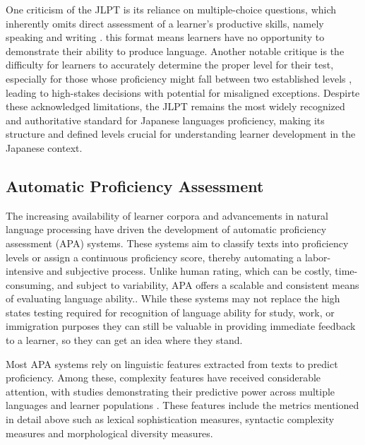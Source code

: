One criticism of the JLPT is its reliance on multiple-choice questions, which inherently omits direct assessment of
a learner's productive skills, namely speaking and writing \citet{JLPTcriticism}. this format means learners have
no opportunity to demonstrate their ability to produce language. Another notable critique is the difficulty for
learners to accurately determine the proper level for their test, especially for those whose proficiency might fall
between two established levels \citep{JLPTcriticism}, leading to high-stakes decisions with potential for misaligned
exceptions. Despirte these acknowledged limitations, the JLPT remains the most widely
recognized and authoritative standard for Japanese languages proficiency, making its structure and defined levels
crucial for understanding learner development in the Japanese context.

\subsection{Automatic Proficiency Assessment}


The increasing availability of learner corpora and advancements in natural language processing have driven the
development of automatic proficiency assessment (APA) systems. These systems aim to classify texts into proficiency
levels or assign a continuous proficiency score, thereby automating a labor-intensive and subjective process. Unlike
human rating, which can be costly, time-consuming, and subject to variability, APA offers a scalable and consistent
means of evaluating language ability.. While these systems may not replace the
high states testing required for recognition of language ability for study, work, or immigration purposes they can
still be valuable in providing immediate feedback to a learner, so they can get an idea where they stand.

Most APA systems rely on linguistic features extracted from texts to predict proficiency. Among these, complexity
features have received considerable attention, with studies demonstrating their predictive power across multiple
languages and learner populations \citep{Lu2010,Ortega2003,Brezina2019,Jiang2019}. These features include the metrics
mentioned in detail above such as lexical sophistication measures, syntactic complexity measures and morphological
diversity measures.

